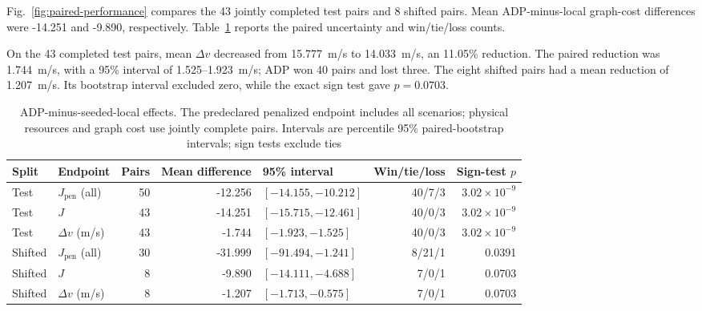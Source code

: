 \documentclass{IEEEtaes}
\newcommand{\unit}[2]{#1~#2}
\newcommand{\RTJointTestN}{43}
\newcommand{\RTTestCostDiff}{-14.251}
\newcommand{\RTJointOodN}{8}
\newcommand{\RTOodCostDiff}{-9.890}
\theoremstyle{remark}
\theoremstyle{plain}
\begin{document}
Fig.~\ref{fig:paired-performance} compares the \RTJointTestN{} jointly completed test pairs and \RTJointOodN{} shifted pairs. Mean ADP-minus-local graph-cost differences were \RTTestCostDiff{} and \RTOodCostDiff{}, respectively. Table~\ref{tab:required-paired} reports the paired uncertainty and win/tie/loss counts.

On the 43 completed test pairs, mean $\Delta v$ decreased from \unit{15.777}{m/s} to \unit{14.033}{m/s}, an 11.05\% reduction. The paired reduction was \unit{1.744}{m/s}, with a 95\% interval of \unit{1.525--1.923}{m/s}; ADP won 40 pairs and lost three. The eight shifted pairs had a mean reduction of \unit{1.207}{m/s}. Its bootstrap interval excluded zero, while the exact sign test gave $p=0.0703$.

\begin{table}[t]
  \centering
  \caption{ADP-minus-seeded-local effects. The predeclared penalized endpoint includes all scenarios; physical resources and graph cost use jointly complete pairs. Intervals are percentile 95\% paired-bootstrap intervals; sign tests exclude ties}
  \label{tab:required-paired}
  \renewcommand{\arraystretch}{1.08}
  \setlength{\tabcolsep}{5pt}
  \footnotesize
  \begin{tabular*}{\linewidth}{@{\extracolsep{\fill}}llrrlrr@{}}
    \toprule
    Split & Endpoint & Pairs & Mean difference & 95\% interval & Win/tie/loss & Sign-test $p$ \\
    \midrule
    Test & $J_{\mathrm{pen}}$ (all) & 50 & -12.256 & $[-14.155,-10.212]$ & 40/7/3 & $3.02\times10^{-9}$ \\
    Test & $J$ & 43 & -14.251 & $[-15.715,-12.461]$ & 40/0/3 & $3.02\times10^{-9}$ \\
    Test & $\Delta v$ (m/s) & 43 & -1.744 & $[-1.923,-1.525]$ & 40/0/3 & $3.02\times10^{-9}$ \\
    Shifted & $J_{\mathrm{pen}}$ (all) & 30 & -31.999 & $[-91.494,-1.241]$ & 8/21/1 & 0.0391 \\
    Shifted & $J$ & 8 & -9.890 & $[-14.111,-4.688]$ & 7/0/1 & 0.0703 \\
    Shifted & $\Delta v$ (m/s) & 8 & -1.207 & $[-1.713,-0.575]$ & 7/0/1 & 0.0703 \\
    \bottomrule
  \end{tabular*}
\end{table}
\end{document}
